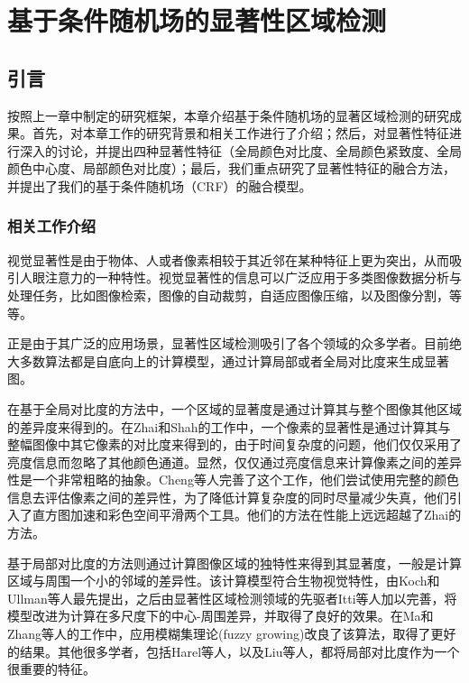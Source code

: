 
\chapter{基于条件随机场的显著性区域检测}
\section{引言}
按照上一章中制定的研究框架，本章介绍基于条件随机场的显著区域检测的研究成果。首先，对本章工作的研究背景和相关工作进行了介绍；然后，对显著性特征进行深入的讨论，并提出四种显著性特征（全局颜色对比度、全局颜色紧致度、全局颜色中心度、局部颜色对比度）；最后，我们重点研究了显著性特征的融合方法，并提出了我们的基于条件随机场（CRF）的融合模型。

\subsection{相关工作介绍}
视觉显著性是由于物体、人或者像素相较于其近邻在某种特征上更为突出，从而吸引人眼注意力的一种特性。视觉显著性的信息可以广泛应用于多类图像数据分析与处理任务，比如图像检索\cite{tsai2012hierarchical}\cite{fang2012effective}，图像的自动裁剪\cite{shechtman2013methods}\cite{deigmoeller2010context}，自适应图像压缩\cite{christopoulos2000jpeg2000}，以及图像分割\cite{jiang2011automatic}\cite{han2006unsupervised}，等等。

正是由于其广泛的应用场景，显著性区域检测吸引了各个领域的众多学者。目前绝大多数算法都是自底向上的计算模型，通过计算局部或者全局对比度来生成显著图。

在基于全局对比度的方法中，一个区域的显著度是通过计算其与整个图像其他区域的差异度来得到的。在Zhai和Shah的工作中\cite{zhai2006visual}，一个像素的显著性是通过计算其与整幅图像中其它像素的对比度来得到的，由于时间复杂度的问题，他们仅仅采用了亮度信息而忽略了其他颜色通道。显然，仅仅通过亮度信息来计算像素之间的差异性是一个非常粗略的抽象。Cheng等人\cite{cheng2011global}完善了这个工作，他们尝试使用完整的颜色信息去评估像素之间的差异性，为了降低计算复杂度的同时尽量减少失真，他们引入了直方图加速和彩色空间平滑两个工具。他们的方法在性能上远远超越了Zhai的方法。

基于局部对比度的方法则通过计算图像区域的独特性来得到其显著度，一般是计算区域与周围一个小的邻域的差异性。该计算模型符合生物视觉特性，由Koch和Ullman等人最先提出\cite{koch1987shifts}，之后由显著性区域检测领域的先驱者Itti等人加以完善\cite{itti1998model}，将模型改进为计算在多尺度下的中心-周围差异，并取得了良好的效果。在Ma和Zhang等人的工作中\cite{ma2003contrast}，应用模糊集理论(fuzzy growing)改良了该算法，取得了更好的结果。其他很多学者，包括Harel等人\cite{harel2006graph}，以及Liu等人\cite{liu2011learning}，都将局部对比度作为一个很重要的特征。

